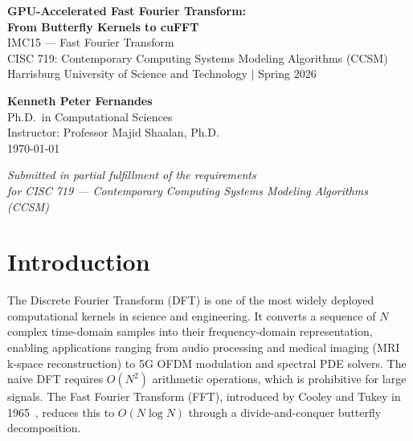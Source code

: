 \documentclass[12pt, letterpaper]{article}
\begin{document}
\begin{titlepage}
    \centering

    \vspace*{3.5cm}
    {\LARGE \textbf{GPU-Accelerated Fast Fourier Transform:\\[0.3cm]
    From Butterfly Kernels to cuFFT}}\\[1.2cm]
    {\large IMC15 --- Fast Fourier Transform}\\[0.5cm]
    {\large CISC 719: Contemporary Computing Systems Modeling Algorithms (CCSM)}\\[0.4cm]
    {\large Harrisburg University of Science and Technology $|$ Spring 2026}

    \vspace{3.5cm}

    {\large \textbf{Kenneth Peter Fernandes}}\\[0.4cm]
    {\normalsize Ph.D.\ in Computational Sciences}\\[0.3cm]
    {\normalsize Instructor: Professor Majid Shaalan, Ph.D.}\\[0.6cm]
    {\large \today}

    \vfill

    \textit{Submitted in partial fulfillment of the requirements\\
    for CISC 719 --- Contemporary Computing Systems Modeling Algorithms (CCSM)}
    \vspace*{0.5cm}
\end{titlepage}

\tableofcontents
\newpage

\section{Introduction}
\label{sec:intro}

The Discrete Fourier Transform (DFT) is one of the most widely deployed computational kernels in science and engineering. It converts a sequence of $N$ complex time-domain samples into their frequency-domain representation, enabling applications ranging from audio processing and medical imaging (MRI k-space reconstruction) to 5G OFDM modulation and spectral PDE solvers. The naive DFT requires $O(N^2)$ arithmetic operations, which is prohibitive for large signals. The Fast Fourier Transform (FFT), introduced by Cooley and Tukey in 1965~\cite{cooleytukey1965}, reduces this to $O(N \log N)$ through a divide-and-conquer butterfly decomposition.
\end{document}
